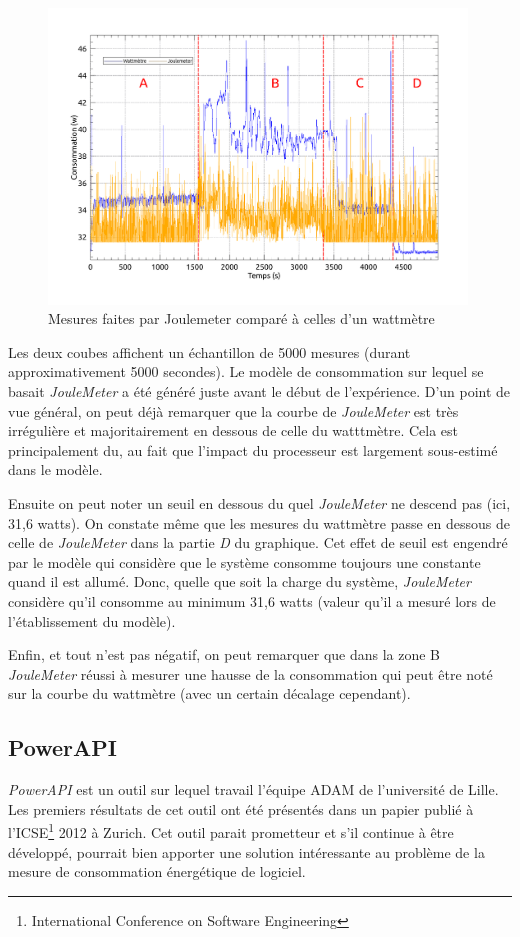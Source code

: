 \documentclass[a4paper, 11pt]{report}
\begin{document}
\begin{figure}
	\includegraphics[width=0.99\textwidth]{figures/joulemeter.pdf}
	\caption{Mesures faites par Joulemeter comparé à celles d'un wattmètre}
	\label{joulemeter}
\end{figure}

Les deux coubes affichent un échantillon  de 5000 mesures (durant approximativement 5000 secondes). Le modèle de consommation sur lequel se basait \textit{JouleMeter} a été généré juste avant le début de l'expérience. D'un point de vue général, on peut déjà remarquer que la courbe de \textit{JouleMeter} est très irrégulière et majoritairement en dessous de celle du watttmètre. Cela est principalement du, au fait que l'impact du processeur est largement sous-estimé dans le modèle.

Ensuite on peut noter un seuil en dessous du quel \textit{JouleMeter} ne descend pas (ici, 31,6 watts). On constate même que les mesures du wattmètre passe en dessous de celle de \textit{JouleMeter} dans la partie \textit{D} du graphique. Cet effet de seuil est engendré par le modèle qui considère que le système consomme toujours une constante quand il est allumé. Donc, quelle que soit la charge du système, \textit{JouleMeter} considère qu'il consomme au minimum 31,6 watts (valeur qu'il a mesuré lors de l'établissement du modèle).

Enfin, et tout n'est pas négatif, on peut remarquer que dans la zone B \textit{JouleMeter} réussi à mesurer une hausse de la consommation qui peut être noté sur la courbe du wattmètre (avec un certain décalage cependant).

		\subsection{PowerAPI}
\textit{PowerAPI} est un outil sur lequel travail l'équipe ADAM de l'université de Lille. Les premiers résultats de cet outil ont été présentés dans un papier\cite{noureddine:hal-00681560} publié à l'ICSE\footnote{International Conference on Software Engineering} 2012 à Zurich. Cet outil parait prometteur et s'il continue à être développé, pourrait bien apporter une solution intéressante au problème de la mesure de consommation énergétique de logiciel.
\end{document}
